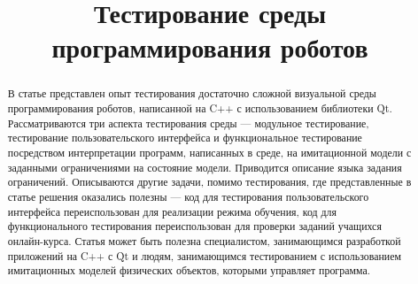 ﻿\documentclass[conference]{IEEEtran}
\begin{document}
\title{Тестирование среды программирования роботов}

\author{
\and
}

\maketitle

\begin{abstract}
В статье представлен опыт тестирования достаточно сложной визуальной среды программирования 
роботов, написанной на C++ с использованием библиотеки Qt. Рассматриваются три аспекта 
тестирования среды --- модульное тестирование, тестирование пользовательского интерфейса 
и функциональное тестирование посредством интерпретации программ, написанных в среде, 
на имитационной модели с заданными ограничениями на состояние модели. Приводится описание 
языка задания ограничений. Описываются другие задачи, помимо тестирования, где представленные 
в статье решения оказались полезны --- код для тестирования пользовательского интерфейса 
переиспользован для реализации режима обучения, код для функционального тестирования 
переиспользован для проверки заданий учащихся онлайн-курса. Статья может быть полезна 
специалистом, занимающимся разработкой приложений на C++ с Qt и людям, занимающимся 
тестированием с использованием имитационных моделей физических объектов, которыми управляет программа.
\end{abstract}
\end{document}

